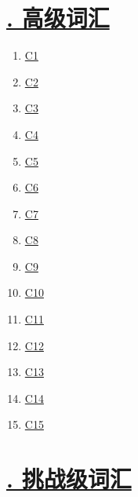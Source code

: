 \documentclass[11pt]{article}
\begin{document}
\section*{\normalfont \large \href{https://www.youtube.com/watch?v=hC8Sr9_WYqo&list=PL7aIrlqqP5K-zxRef5HsWBdBQrMXy4bNp}{. 高级词汇} }

\vspace{-0.5cm}

\begin{multicols}{5}
	\begin{enumerate}
		\item \href{https://mp.weixin.qq.com/s/Doz4bJHWTaih1G1-lTrcsA}{C1}	%
		\item \href{https://mp.weixin.qq.com/s/C62PImjjTqiCjOAj-iPf8A}{C2}	%
		\item \href{https://mp.weixin.qq.com/s/VbifyZMwn0d4cBRQ-Ny2aw}{C3}	%
		\item \href{https://mp.weixin.qq.com/s/WUHqrjggyOfu1OJOWVbpJw}{C4}	%
		\item \href{https://mp.weixin.qq.com/s/BNs0qWXNHS_2jPhVL-ND0Q}{C5}	%
		\item \href{https://mp.weixin.qq.com/s/1HNybLGpDflSixYS1o7xdQ}{C6}	%
		\item \href{https://mp.weixin.qq.com/s/BSX9ZVcntWh-h0zHRQtHxw}{C7}	%
		\item \href{https://mp.weixin.qq.com/s/52mk0CN9E4C9hkJDbZcOxA}{C8}	%
		\item \href{https://mp.weixin.qq.com/s/-A6H3K09FgfwrRNq2Qb7Jw}{C9}	%
		\item \href{https://mp.weixin.qq.com/s/_7nH1fyVvx3uasAo6w5ibQ}{C10}	%
		\item \href{https://mp.weixin.qq.com/s/lmti4hfImFIEKaCIm4SkYA}{C11}	%
		\item \href{https://mp.weixin.qq.com/s/jCYoHKaDgCN-_jPRERRgMQ}{C12}	%
		\item \href{https://mp.weixin.qq.com/s/qL7h9YYokdKKYEjTabuQCg}{C13}	%
		\item \href{https://mp.weixin.qq.com/s/il5aKnCwGG6lOspxHLFc0w}{C14}	%
		\item \href{https://mp.weixin.qq.com/s/iCGXDnPx5skbH9vcvya_6A}{C15}	%
	\end{enumerate}
\end{multicols}



\vspace{-0.5cm}

\section*{\normalfont \large \href{https://www.youtube.com/watch?v=kvj2Pkj12xs&list=PL7aIrlqqP5K-M8Ip7vGkKVK8FhkkliDYz}{. 挑战级词汇} }
\end{document}
